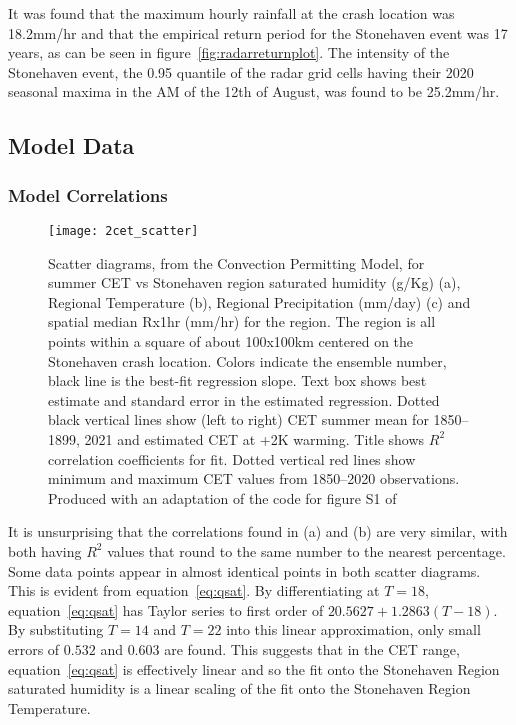 It was found that the maximum hourly rainfall at the crash location was 18.2mm/hr and
    that the empirical return period for the Stonehaven event was 17 years,
    as can be seen in figure~\ref{fig:radarreturnplot}.
The intensity of the Stonehaven event,
    the 0.95 quantile of the radar grid cells having their 2020 seasonal maxima in the AM of the 12th of August,
    was found to be 25.2mm/hr.


\subsection{Model Data}\label{subsec:modelcorr}

\subsubsection{Model Correlations}

\begin{figure}[H]
    \centering
    \texttt{[image: 2cet\_scatter]}
    \caption[Scatter diagrams from the Convection Permitting Model.]{
        Scatter diagrams, from the Convection Permitting Model,
        for summer CET vs Stonehaven region saturated humidity (g/Kg) (a),
        Regional Temperature (b),
        Regional  Precipitation (mm/day) (c) and
        spatial median Rx1hr (mm/hr) for the region.
    The region is all points within a square of about 100x100km centered on the Stonehaven crash location.
    Colors indicate the ensemble number, black line is the best-fit regression slope.
    Text box shows best estimate and standard error in the estimated regression.
    Dotted black vertical lines show (left to right) CET summer mean for 1850--1899, 2021 and estimated CET at +2K warming.
    Title shows $R^2$ correlation coefficients for fit.
    Dotted vertical red lines show minimum and maximum CET values from 1850--2020 observations.
    Produced with an adaptation of the code for figure S1 of~\cite{Tett_Soon}}
    \label{fig:2cet_scatter}
\end{figure}

It is unsurprising that the correlations found in (a) and (b) are very similar,
    with both having $R^2$ values that round to the same number to the nearest percentage.
Some data points appear in almost identical points in both scatter diagrams.
This is evident from equation~\ref{eq:qsat}.
By differentiating at $T=18$,
    equation~\ref{eq:qsat} has Taylor series to first order of $20.5627+1.2863(T-18)$.
By substituting $T=14$ and $T=22$ into this linear approximation,
    only small errors of $0.532$ and $0.603$ are found.
This suggests that in the CET range, equation~\ref{eq:qsat} is effectively linear and so the fit onto the Stonehaven Region saturated humidity
    is a linear scaling of the fit onto the Stonehaven Region Temperature.

